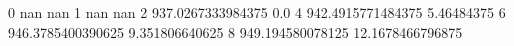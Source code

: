 0 nan nan
1 nan nan
2 937.0267333984375 0.0
4 942.4915771484375 5.46484375
6 946.3785400390625 9.351806640625
8 949.194580078125 12.1678466796875
